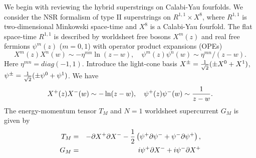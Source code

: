 \documentclass[a4paper,12pt]{article}
\begin{document}
We begin with reviewing the hybrid superstrings on Calabi-Yau
fourfolds\cite{BeGuVa}. 
We consider the NSR formalism of type II superstrings on
$R^{1,1}\times X^{8}$, where $R^{1,1}$ is two-dimensional Minkowski
space-time
and $X^{8}$ is a Calabi-Yau fourfold.
The flat space-time $R^{1,1}$ is described by worldsheet free bosons
 $X^{m}(z)$ and 
real free fermions $\psi^{m}(z)$ ($m=0,1$) 
with operator product expansions (OPEs)
\begin{equation}
 X^{m}(z)X^{n}(w)\sim -\eta^{mn}\ln(z-w),\quad
\psi^{m}(z)\psi^{n}(w)\sim\eta^{mn}/(z-w).
\end{equation}
Here $\eta^{mn}=diag(-1,1)$.
Introduce the light-cone basis $X^{\pm}={1\over\sqrt{2}}(\pm X^{0}+
X^{1})$, $\psi^{\pm}={1\over\sqrt{2}}(\pm \psi^{0}+
\psi^{1})$. 
We have
\begin{equation}
 X^{+}(z)X^{-}(w)\sim -\ln(z-w),\quad
\psi^{+}(z)\psi^{-}(w)\sim {1\over z-w}.
\end{equation}
The energy-momentum tensor $T_{M}$ and $N=1$ worldsheet supercurrent
$G_{M}$ is given by
\begin{eqnarray}
 T_{M}&=&-\partial X^{+}\partial X^{-}
-{1\over2}\left(\psi^{+}\partial\psi^{-}+\psi^{-}\partial\psi^{+}\right),
\nonumber\\
G_{M}&=& i\psi^{+}\partial X^{-}+i \psi^{-}\partial X^{+}
\end{eqnarray}
\end{document}
